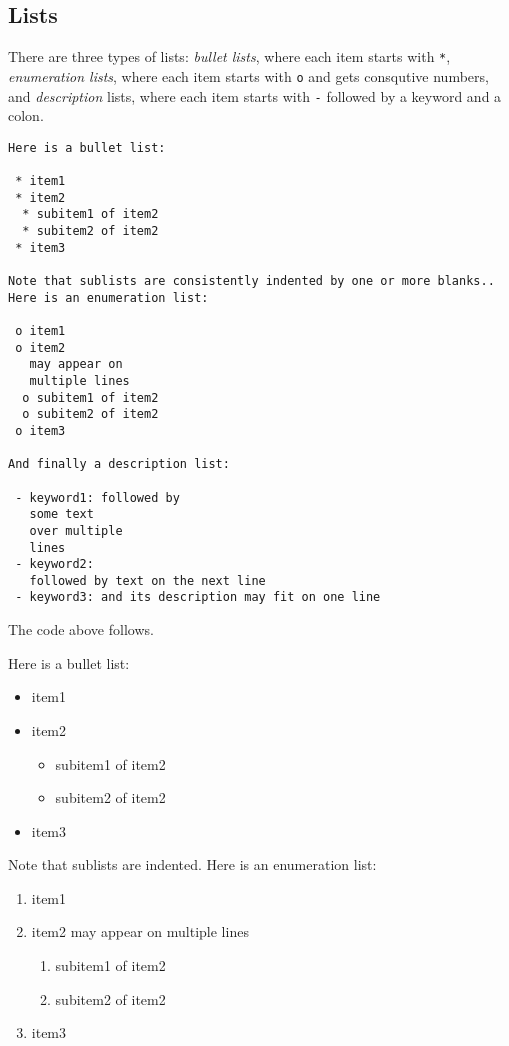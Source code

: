 \documentclass[%
oneside,                 %
final,                   %
10pt]{article}
\begin{document}
\subsection{Lists}

There are three types of lists: \emph{bullet lists}, where each item starts
with \Verb!*!, \emph{enumeration lists}, where each item starts with \Verb!o! and gets
consqutive numbers,
and \emph{description} lists, where each item starts with \Verb!-! followed
by a keyword and a colon.
\begin{Verbatim}[numbers=none,fontsize=\fontsize{9pt}{9pt},baselinestretch=0.85,xleftmargin=0mm]
Here is a bullet list:

 * item1
 * item2
  * subitem1 of item2
  * subitem2 of item2
 * item3

Note that sublists are consistently indented by one or more blanks..
Here is an enumeration list:

 o item1
 o item2
   may appear on
   multiple lines
  o subitem1 of item2
  o subitem2 of item2
 o item3

And finally a description list:

 - keyword1: followed by
   some text
   over multiple
   lines
 - keyword2:
   followed by text on the next line
 - keyword3: and its description may fit on one line
\end{Verbatim}
The code above follows.

Here is a bullet list:

\begin{itemize}
 \item item1

 \item item2
\begin{itemize}

  \item subitem1 of item2

  \item subitem2 of item2

\end{itemize}

\noindent
 \item item3
\end{itemize}

\noindent
Note that sublists are indented.
Here is an enumeration list:

\begin{enumerate}
\item item1

\item item2
   may appear on
   multiple lines
\begin{enumerate}

 \item subitem1 of item2

 \item subitem2 of item2

\end{enumerate}

\noindent
\item item3
\end{enumerate}
\end{document}
